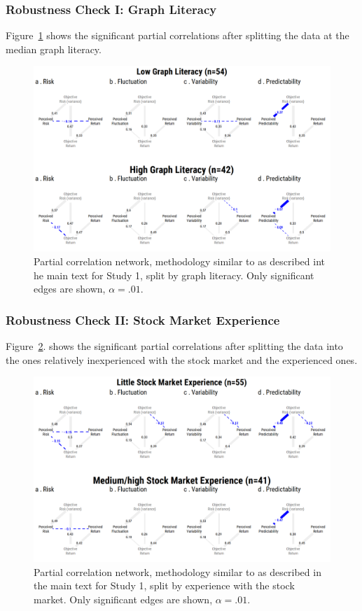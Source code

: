 \newpage
\subsubsection{Robustness Check I: Graph Literacy}
Figure~\ref{fig:study1_pcor_by_glit} shows the significant partial correlations after splitting the data at the median graph literacy.
\begin{figure}[H] 
 \centering
 \includegraphics[width=.8\linewidth, keepaspectratio]{sfig1.png} 
 \caption{Partial correlation network, methodology similar to as described int he main text for Study 1, split by graph literacy. Only significant edges are shown, $\alpha=.01$.}
 \label{fig:study1_pcor_by_glit}
\end{figure}

\subsubsection{Robustness Check II: Stock Market Experience}
Figure~\ref{fig:study1_pcor_by_exp}. shows the significant partial correlations after splitting the data into the ones relatively inexperienced with the stock market and the experienced ones.
\begin{figure}[H] 
 \centering
 \includegraphics[width=.8\linewidth, keepaspectratio]{sfig2.png} 
 \caption{Partial correlation network, methodology similar to as described in the main text for Study 1, split by experience with the stock market. Only significant edges are shown, $\alpha=.01$.}
 \label{fig:study1_pcor_by_exp}
\end{figure}





